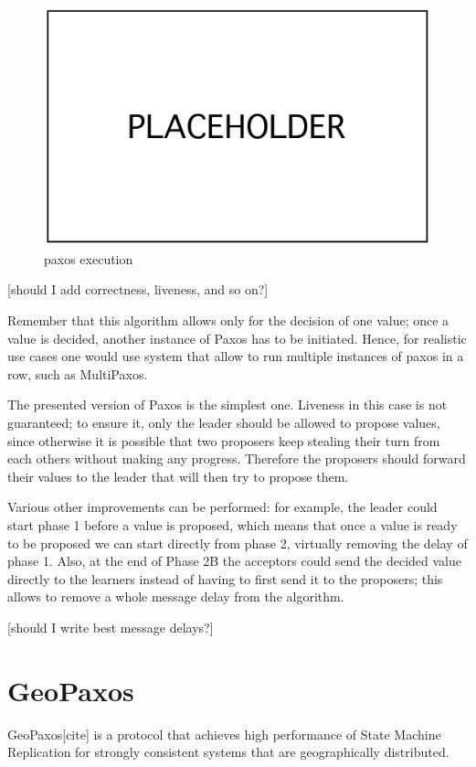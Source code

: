 \begin{figure}[htb]
\centering
\includegraphics[width=\textwidth,height=\textheight,keepaspectratio]{img/placeholder.png}

\caption[The architecture of the system]{ paxos execution }
\label{fig:paxos}
\end{figure}

[should I add correctness, liveness, and so on?]

Remember that this algorithm allows only for the decision of one value; once a value is decided, another instance of Paxos has to be initiated. Hence, for realistic use cases one would use system that allow to run multiple instances of paxos in a row, such as MultiPaxos.

The presented version of Paxos is the simplest one. Liveness in this case is not guaranteed; to ensure it, only the leader should be allowed to propose values, since otherwise it is possible that two proposers keep stealing their turn from each others without making any progress. Therefore the proposers should forward their values to the leader that will then try to propose them.

Various other improvements can be performed: for example, the leader could start phase 1 before a value is proposed, which means that once a value is ready to be proposed we can start directly from phase 2, virtually removing the delay of phase 1.
Also, at the end of Phase 2B the acceptors could send the decided value directly to the learners instead of having to first send it to the proposers; this allows to remove a whole message delay from the algorithm.

[should I write best message delays?]

\section{GeoPaxos}\label{sec:GeoPaxos}
GeoPaxos[cite] is a protocol that achieves high performance of State Machine Replication for strongly consistent systems that are geographically distributed. 

